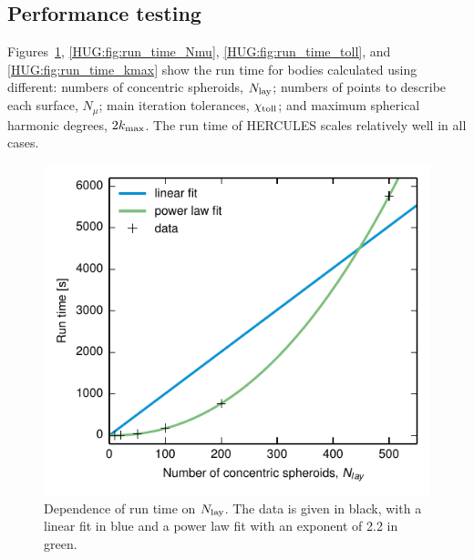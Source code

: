 \documentclass[11pt, oneside]{article}   	%
\begin{document}
\subsection{Performance testing}

Figures~\ref{HUG:fig:run_time_Nlay}, \ref{HUG:fig:run_time_Nmu}, \ref{HUG:fig:run_time_toll}, and \ref{HUG:fig:run_time_kmax} show the run time for bodies calculated using different: numbers of concentric spheroids, $N_{\rm lay}$; numbers of points to describe each surface, $N_{\mu}$; main iteration tolerances, $\chi_{\rm toll}$; and maximum spherical harmonic degrees, $2k_{\rm max}$. The run time of HERCULES scales relatively well in all cases.

\begin{figure}[]
   \centering
   \includegraphics[]{Figures/Run_time_Nlay.pdf} 
   \caption{Dependence of run time on $N_{\rm lay}$. The data is given in black, with a linear fit in blue and a power law fit with an exponent of 2.2 in green.}
   \label{HUG:fig:run_time_Nlay}
\end{figure}
\end{document}
